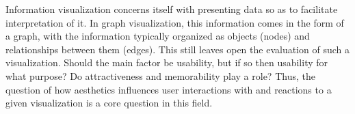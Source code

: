 \documentclass[12pt, twocolumn]{article}
\begin{document}
Information visualization concerns itself with presenting data so as to facilitate interpretation of it. 
In graph visualization, this information comes in the form of a graph, with the information typically organized as objects (nodes) and relationships between them (edges).
This still leaves open the evaluation of such a visualization. 
Should the main factor be usability, but if so then usability for what purpose?
Do attractiveness and memorability play a role?
Thus, the question of how aesthetics influences user interactions with and reactions to a given visualization is a core question in this field. 
\\
\end{document}
